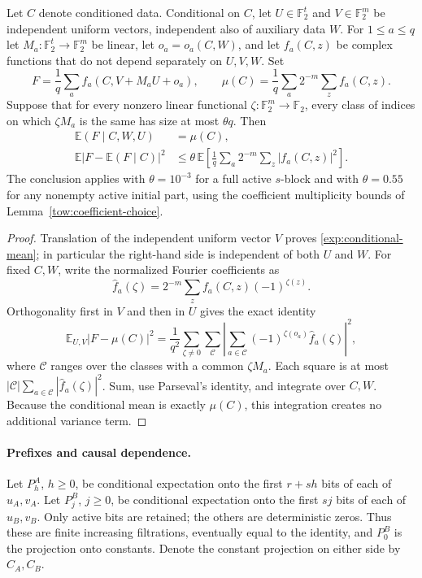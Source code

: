 \begin{lemma}\label{exp:fourier}
Let $C$ denote conditioned data. Conditional on $C$, let
$U\in\mathbb F_2^t$ and $V\in\mathbb F_2^m$ be independent uniform
vectors, independent also of auxiliary data $W$. For $1\leq a\leq q$
let $M_a:\mathbb F_2^t\to\mathbb F_2^m$ be linear, let
$o_a=o_a(C,W)$, and let $f_a(C,z)$ be complex functions that do not
depend separately on $U,V,W$. Set
\[
 F=\frac1q\sum_a f_a(C,V+M_aU+o_a),\qquad
 \mu(C)=\frac1q\sum_a2^{-m}\sum_z f_a(C,z).
\]
Suppose that for every nonzero linear functional
$\zeta:\mathbb F_2^m\to\mathbb F_2$, every class of indices on which
$\zeta M_a$ is the same has size at most $\theta q$. Then
\begin{align}
 \mathbb E(F\mid C,W,U)&=\mu(C),\label{exp:conditional-mean}\\
 \mathbb E|F-\mathbb E(F\mid C)|^2
 &\leq\theta\,\mathbb E\left[
    \frac1q\sum_a2^{-m}\sum_z|f_a(C,z)|^2\right].
 \label{exp:conditional-variance}
\end{align}
The conclusion applies with $\theta=10^{-3}$ for a full active
$s$-block and with $\theta=0.55$ for any nonempty active initial
part, using the coefficient multiplicity bounds of
Lemma~\ref{tow:coefficient-choice}.
\end{lemma}

\begin{proof}
Translation of the independent uniform vector $V$ proves
\eqref{exp:conditional-mean}; in particular the right-hand side is
independent of both $U$ and $W$. For fixed $C,W$, write the normalized
Fourier coefficients as
\[
 \widehat f_a(\zeta)=2^{-m}\sum_z
       f_a(C,z)(-1)^{\zeta(z)}.
\]
Orthogonality first in $V$ and then in $U$ gives the exact identity
\[
 \mathbb E_{U,V}|F-\mu(C)|^2
 =\frac1{q^2}\sum_{\zeta\ne0}\sum_{\mathcal C}
 \left|\sum_{a\in\mathcal C}
       (-1)^{\zeta(o_a)}\widehat f_a(\zeta)\right|^2,
\]
where $\mathcal C$ ranges over the classes with a common
$\zeta M_a$. Each square is at most
$|\mathcal C|\sum_{a\in\mathcal C}|\widehat f_a(\zeta)|^2$.
Sum, use Parseval's identity, and integrate over $C,W$. Because the
conditional mean is exactly $\mu(C)$, this integration creates no
additional variance term.
\end{proof}

\paragraph{Prefixes and causal dependence.}
Let $P_h^A$, $h\geq0$, be conditional expectation onto the first
$r+sh$ bits of each of $u_A,v_A$. Let $P_j^B$, $j\geq0$, be
conditional expectation onto the first $sj$ bits of each of $u_B,v_B$.
Only active bits are retained; the others are deterministic zeros.
Thus these are finite increasing filtrations, eventually equal to the
identity, and $P_0^B$ is the projection onto constants. Denote the
constant projection on either side by $C_A,C_B$.

